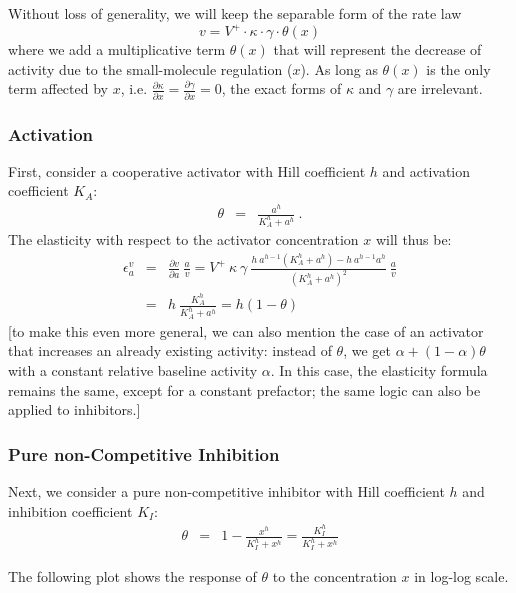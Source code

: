 \documentclass[12pt,a4paper]{article}
\newcommand{\wolf}[1]{{\color{red} [#1]}}
\begin{document}
Without loss of generality, we will keep the separable form of the rate law
\[v = V^+ \cdot \kappa \cdot \gamma \cdot \theta(x)\]
where we add a multiplicative term $\theta(x)$ that will represent the decrease of activity due to the small-molecule regulation ($x$). As long as $\theta(x)$ is the only term affected by $x$, i.e. $\frac{\partial \kappa}{\partial x} = \frac{\partial \gamma}{\partial x} = 0$, the exact forms of $\kappa$ and $\gamma$ are irrelevant.

\subsubsection{Activation}
First, consider a cooperative \cite{Barcroft1910-rx, Monod1965-dq} activator with Hill coefficient $h$ and activation coefficient $K_A$:
\begin{eqnarray}
    \theta &=& \frac{a^h}{K_A^h + a^h}~.
\end{eqnarray}
The elasticity with respect to the activator concentration $x$ will thus be:
\begin{eqnarray}
    \epsilon_a^v &=& \frac{\partial v}{\partial a} ~ \frac{a}{v} = V^+ ~ \kappa ~ \gamma ~ \frac{h~a^{h-1} (K_A^h + a^h) - h~a^{h-1} a^h}{(K_A^h + a^h)^2}~\frac{a}{v} \nonumber \\
    &=& h~\frac{K_A^h}{K_A^h + a^h} = h (1 - \theta) \label{eq:eps_act}
\end{eqnarray}
\wolf{to make this even more general, we can also mention the case
	of an activator that increases an already existing activity: instead
	of $\theta$, we get $\alpha + (1-\alpha) \theta$ with a constant
	relative baseline activity $\alpha$. In this case, the elasticity
	formula remains the same, except for a constant prefactor; the same
	logic can also be applied to inhibitors.}

\subsubsection{Pure non-Competitive Inhibition}
Next, we consider a pure non-competitive inhibitor with Hill coefficient $h$ and inhibition coefficient $K_I$:
\begin{eqnarray}
    \theta &=& 1 - \frac{x^h}{K_I^h + x^h} = \frac{K_I^h}{K_I^h + x^h}
\end{eqnarray}

The following plot shows the response of $\theta$ to the concentration $x$ in log-log scale.

\begin{center}
\end{center}
\end{document}

